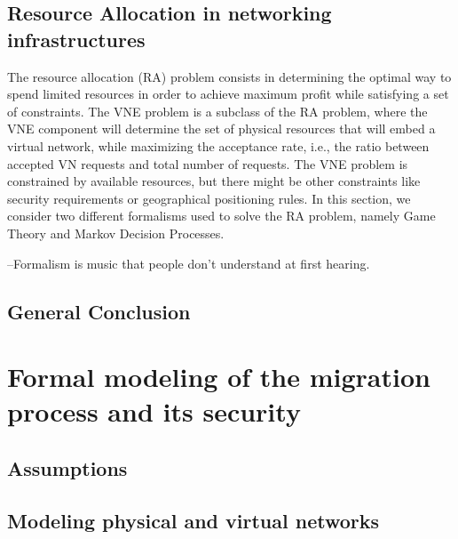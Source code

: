 \documentclass[a4paper, 11pt]{report}
\newcommand{\ie}{i.e.,\xspace}
\theoremstyle{definition}
\begin{document}


\section{Resource Allocation in networking infrastructures}
The resource allocation (RA) problem consists in determining the optimal way to spend limited resources in order to achieve maximum profit while satisfying a set of constraints.
The VNE problem is a subclass of the RA problem, where the VNE component will determine the set of physical resources that will embed a virtual network, while maximizing the acceptance rate, \ie the ratio between accepted VN requests and total number of requests.
The VNE problem is constrained by available resources, but there might be other constraints like security requirements or geographical positioning rules.
In this section, we consider two different formalisms used to solve the RA problem, namely Game Theory and Markov Decision Processes. 

% 



\begin{savequote}

--Formalism is music that people don’t understand at first hearing.
\end{savequote}
\section{General Conclusion}


\newpage
\chapter{Formal modeling of the migration process and its security}
\label{sec:formal_model}


% 

\section{Assumptions}


\section{Modeling physical and virtual networks}

\end{document}
